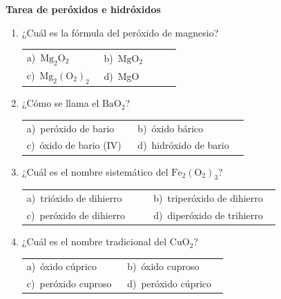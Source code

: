 \documentclass[11pt,a4paper]{article}
\begin{document}
{\Large\bfseries Tarea de peróxidos e hidróxidos}
\vspace{12pt}
\begin{enumerate}[label=\textbf{\arabic*.},leftmargin=*,itemsep=11pt,topsep=0pt]
\item \begin{minipage}[t]{\linewidth}
¿Cuál es la fórmula del peróxido de magnesio?

\vspace{5pt}
\begin{tabular}{@{}p{0.47\linewidth}p{0.47\linewidth}@{}}
a)~$\mathrm{Mg_{2}O_{2}}$ & b)~$\mathrm{MgO_{2}}$ \\
c)~$\mathrm{Mg_{2}(O_{2})_{2}}$ & d)~MgO \\
\end{tabular}
\end{minipage}

\item \begin{minipage}[t]{\linewidth}
¿Cómo se llama el $\mathrm{BaO_{2}}$?

\vspace{5pt}
\begin{tabular}{@{}p{0.47\linewidth}p{0.47\linewidth}@{}}
a)~peróxido de bario & b)~óxido bárico \\
c)~óxido de bario (IV) & d)~hidróxido de bario \\
\end{tabular}
\end{minipage}

\item \begin{minipage}[t]{\linewidth}
¿Cuál es el nombre sistemático del $\mathrm{Fe_{2}(O_{2})_{3}}$?

\vspace{5pt}
\begin{tabular}{@{}p{0.47\linewidth}p{0.47\linewidth}@{}}
a)~trióxido de dihierro & b)~triperóxido de dihierro \\
c)~peróxido de dihierro & d)~diperóxido de trihierro \\
\end{tabular}
\end{minipage}

\item \begin{minipage}[t]{\linewidth}
¿Cuál es el nombre tradicional del $\mathrm{CuO_{2}}$?

\vspace{5pt}
\begin{tabular}{@{}p{0.47\linewidth}p{0.47\linewidth}@{}}
a)~óxido cúprico & b)~óxido cuproso \\
c)~peróxido cuproso & d)~peróxido cúprico \\
\end{tabular}
\end{minipage}


\end{enumerate}
\end{document}
